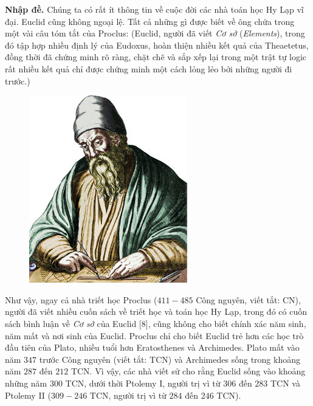 \begin{multicols}{2}
	\textbf{\color{lichsutoanhoc}Nhập đề.}
	Chúng ta có rất ít thông tin về cuộc đời các nhà toán học Hy Lạp vĩ đại. Euclid cũng không ngoại lệ. Tất cả những gì được biết về ông chứa trong một vài câu tóm tắt của Proclus: (Euclid, người đã viết \textit{Cơ sở} (\textit{Elements}), trong đó tập hợp nhiều định lý của Eudoxus, hoàn thiện nhiều kết quả của Theaetetus, đồng thời đã chứng minh rõ ràng, chặt chẽ và sắp xếp lại trong một trật tự logic rất nhiều kết quả chỉ được chứng minh một cách lỏng lẻo bởi những người đi trước.)
		\begin{figure}[H]
		\vspace*{-5pt}
		\centering
		\captionsetup{labelformat= empty, justification=centering}
		\includegraphics[width= 1\linewidth]{1}
		\vspace*{-10pt}
	\end{figure}
	Như vậy, ngay cả nhà triết học Proclus ($411-485$ Công nguyên, viết tắt: CN), người đã viết nhiều cuốn sách về triết học và toán học Hy Lạp, trong đó có cuốn sách bình luận về \textit{Cơ sở} của Euclid [$8$], cũng không cho biết chính xác năm sinh, năm mất và nơi sinh của Euclid. Proclus chỉ cho biết Euclid trẻ hơn các học trò đầu tiên của Plato, nhiều tuổi hơn Eratosthenes và Archimedes. Plato mất vào năm $347$ trước Công nguyên (viết tắt: TCN) và Archimedes sống trong khoảng năm $287$ đến $212$ TCN. Vì vậy, các nhà viết sử cho rằng Euclid sống vào khoảng những năm $300$ TCN, dưới thời Ptolemy I, người trị vì từ $306$ đến $283$ TCN và Ptolemy II ($309-246$ TCN, người trị vì từ $284$ đến $246$ TCN). 

\end{multicols}
